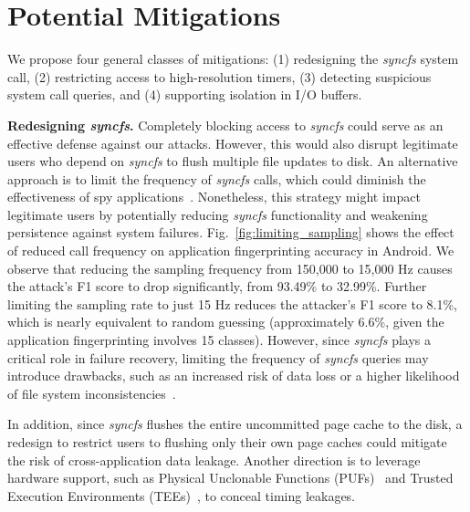 \section{Potential Mitigations} 
\label{sec:mitigation}

We propose four general classes of mitigations: (1) redesigning the \textit{syncfs} system call, (2) restricting access to high-resolution timers, (3) detecting suspicious system call queries, and (4) supporting isolation in I/O buffers. 



     

 \textbf{Redesigning \textit{syncfs}.} Completely blocking access to \textit{syncfs} could serve as an effective defense against our attacks. However, this would also disrupt legitimate users who depend on \textit{syncfs} to flush multiple file updates to disk. An alternative approach is to limit the frequency of \textit{syncfs} calls, which could diminish the effectiveness of spy applications~\cite{naghibijouybari2018rendered, wang2023danger}. Nonetheless, this strategy might impact legitimate users by potentially reducing \textit{syncfs} functionality and weakening persistence against system failures. Fig.~\ref{fig:limiting_sampling} shows the effect of reduced call frequency on application fingerprinting accuracy in Android.
We observe that reducing the sampling frequency from 150,000 to 15,000 Hz causes the attack's F1 score to drop significantly, from 93.49\% to 32.99\%. Further limiting the sampling rate to just 15 Hz reduces the attacker's F1 score to 8.1\%, which is nearly equivalent to random guessing (approximately 6.6\%, given the application fingerprinting involves 15 classes). However, since \textit{syncfs} plays a critical role in failure recovery, limiting the frequency of \textit{syncfs} queries may introduce drawbacks, such as an increased risk of data loss or a higher likelihood of file system inconsistencies~\cite{rebello2021can, verma2015failure}.

In addition, since \textit{syncfs} flushes the entire uncommitted page cache to the disk, a redesign to restrict users to flushing only their own page caches could mitigate the risk of cross-application data leakage. 
Another direction is to leverage hardware support, such as Physical Unclonable Functions (PUFs)~\cite{bai2016puf, bai2021novel} and Trusted Execution Environments (TEEs)~\cite{li2024sok}, to conceal timing leakages.


